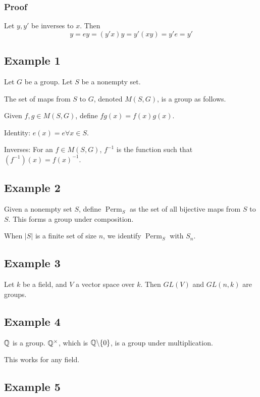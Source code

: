\documentclass[x11names,reqno,14pt]{extarticle}
\begin{document}
\subsubsection*{Proof}

Let $y, y'$ be inverses to $x$. Then 
\[
y = ey = (y'x)y = y'(xy) = y'e = y'
\]

\subsection*{Example 1}

Let $G$ be a group. Let $S$ be a nonempty set. 

The set of maps from $S$ to $G$, denoted $M(S, G)$, is a group as follows. 

Given $f, g \in M(S, G)$, define $fg(x) = f(x)g(x)$. 

Identity: $e(x) = e \forall x \in S$. 

Inverses: For an $f \in M(S, G)$, $f^{-1}$ is the function such that $(f^{-1})(x) = f(x)^{-1}$. 

\subsection*{Example 2}

Given a nonempty set $S$, define $\operatorname{Perm}_S$ as the set of all bijective maps from $S$ to $S$. This forms a group under composition. 

When $|S|$ is a finite set of size $n$, we identify $\operatorname{Perm}_S$ with $S_n$. 

\subsection*{Example 3}

Let $k$ be a field, and $V$ a vector space over $k$. Then $GL(V)$ and $GL(n, k)$ are groups. 

\subsection*{Example 4}

$\mathbb{Q}$ is a group. $\mathbb{Q}^\times$, which is $\mathbb{Q} \backslash\{0\}$, is a group under multiplication. 

This works for any field. 

\subsection*{Example 5}
\end{document}
